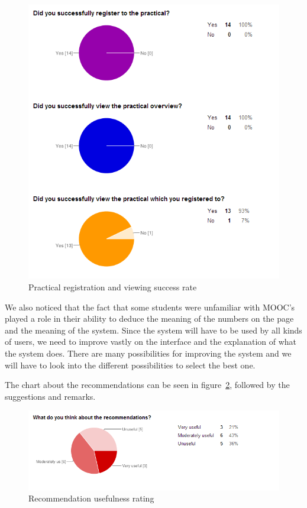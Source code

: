 \begin{figure}[H]
    \centering
    \includegraphics[width=\textwidth]{images/register_practical_chart}
    \caption{Practical registration and viewing success rate}
    \label{register_practical_chart}
\end{figure}

We also noticed that the fact that some students were unfamiliar with MOOC's played a role in their ability to deduce the meaning of the numbers on the page and the meaning of the system.
Since the system will have to be used by all kinds of users, we need to improve vastly on the interface and the explanation of what the system does.
There are many possibilities for improving the system and we will have to look into the different possibilities to select the best one.

The chart about the recommendations can be seen in figure~\ref{recommendations_chart}, followed by the suggestions and remarks.\\
\begin{figure}[H]
    \centering
    \includegraphics[width=\textwidth]{images/recommendations_chart}
    \caption{Recommendation usefulness rating}
    \label{recommendations_chart}
\end{figure}

